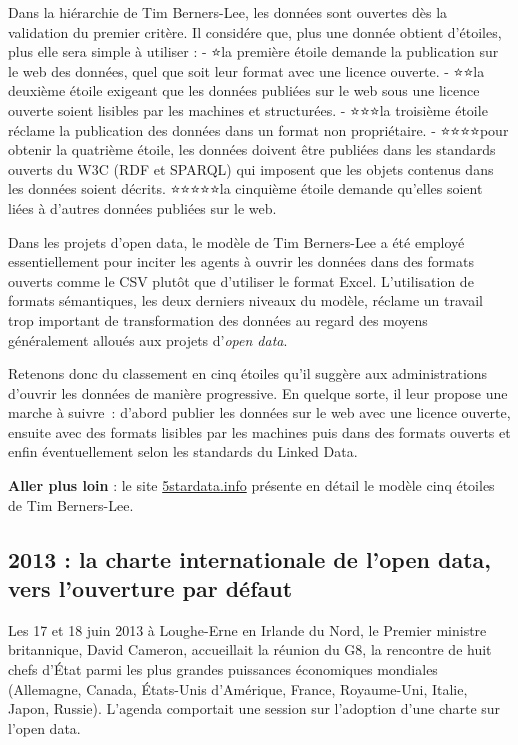 \documentclass[]{book}
\theoremstyle{definition}
\theoremstyle{definition}
\theoremstyle{definition}
\theoremstyle{remark}
\begin{document}
Dans la hiérarchie de Tim Berners-Lee, les données sont ouvertes dès la
validation du premier critère. Il considére que, plus une donnée obtient
d'étoiles, plus elle sera simple à utiliser : - ⭐la première étoile
demande la publication sur le web des données, quel que soit leur format
avec une licence ouverte. - ⭐⭐la deuxième étoile exigeant que les
données publiées sur le web sous une licence ouverte soient lisibles par
les machines et structurées. - ⭐⭐⭐la troisième étoile réclame la
publication des données dans un format non propriétaire. - ⭐⭐⭐⭐pour
obtenir la quatrième étoile, les données doivent être publiées dans les
standards ouverts du W3C (RDF et SPARQL) qui imposent que les objets
contenus dans les données soient décrits. ⭐⭐⭐⭐⭐la cinquième étoile
demande qu'elles soient liées à d'autres données publiées sur le web.

Dans les projets d'open data, le modèle de Tim Berners-Lee a été employé
essentiellement pour inciter les agents à ouvrir les données dans des
formats ouverts comme le CSV plutôt que d'utiliser le format Excel.
L'utilisation de formats sémantiques, les deux derniers niveaux du
modèle, réclame un travail trop important de transformation des données
au regard des moyens généralement alloués aux projets d'\emph{open
data}.

Retenons donc du classement en cinq étoiles qu'il suggère aux
administrations d'ouvrir les données de manière progressive. En quelque
sorte, il leur propose une marche à suivre~: d'abord publier les données
sur le web avec une licence ouverte, ensuite avec des formats lisibles
par les machines puis dans des formats ouverts et enfin éventuellement
selon les standards du Linked Data.

\textbf{Aller plus loin} : le site
\href{http://5stardata.info/fr/}{5stardata.info} présente en détail le
modèle cinq étoiles de Tim Berners-Lee.

\subsection{2013 : la charte internationale de l'open data, vers
l'ouverture par
défaut}\label{la-charte-internationale-de-lopen-data-vers-louverture-par-defaut}

Les 17 et 18 juin 2013 à Loughe-Erne en Irlande du Nord, le Premier
ministre britannique, David Cameron, accueillait la réunion du G8, la
rencontre de huit chefs d'État parmi les plus grandes puissances
économiques mondiales (Allemagne, Canada, États-Unis d'Amérique, France,
Royaume-Uni, Italie, Japon, Russie). L'agenda comportait une session sur
l'adoption d'une charte sur l'open data.
\end{document}
